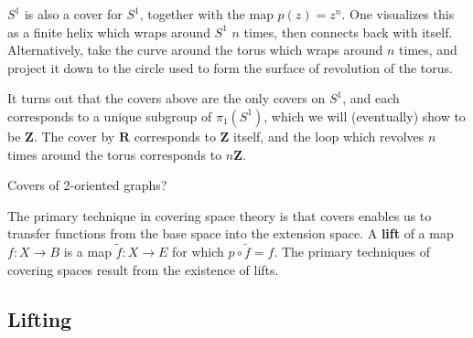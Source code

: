 \begin{example}
    $S^1$ is also a cover for $S^1$, together with the map $p(z) = z^n$. One visualizes this as a finite helix which wraps around $S^1$ $n$ times, then connects back with itself. Alternatively, take the curve around the torus which wraps around $n$ times, and project it down to the circle used to form the surface of revolution of the torus.
\end{example}

It turns out that the covers above are the only covers on $S^1$, and each corresponds to a unique subgroup of $\pi_1(S^1)$, which we will (eventually) show to be $\mathbf{Z}$. The cover by $\mathbf{R}$ corresponds to $\mathbf{Z}$ itself, and the loop which revolves $n$ times around the torus corresponds to $n \mathbf{Z}$.

\begin{example}
    Covers of 2-oriented graphs?
\end{example}

The primary technique in covering space theory is that covers enables us to transfer functions from the base space into the extension space. A {\bf lift} of a map $f: X \to B$ is a map $\tilde{f}: X \to E$ for which $p \circ \tilde{f} = f$. The primary techniques of covering spaces result from the existence of lifts.

\subsection{Lifting}

